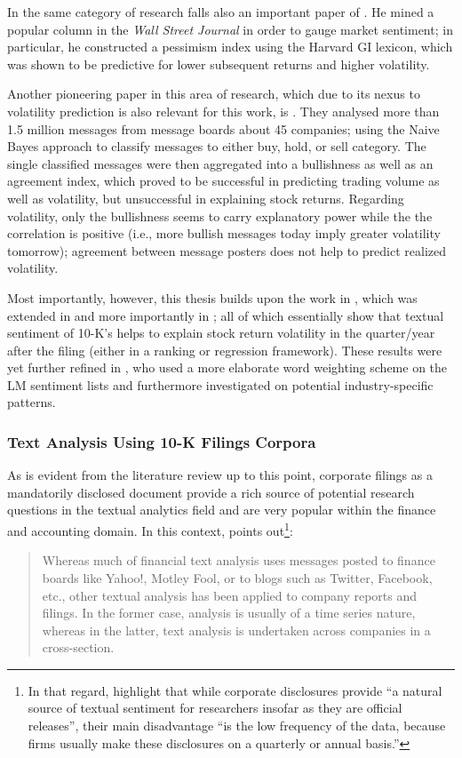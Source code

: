 In the same category of research falls also an important paper of \textcite{Tetlock2007}. He mined a popular column in the \textit{Wall Street Journal} in order to gauge market sentiment; in particular, he constructed a pessimism index using the Harvard GI lexicon, which was shown to be predictive for lower subsequent returns and higher volatility.

Another pioneering paper in this area of research, which due to its nexus to volatility prediction is also relevant for this work, is \textcite{AntweilerFrank2004}. They analysed more than 1.5 million messages from message boards about 45 companies; using the Naive Bayes approach to classify messages to either buy, hold, or sell category. The single classified messages were then aggregated into a bullishness as well as an agreement index, which proved to be successful in predicting trading volume as well as volatility, but unsuccessful in explaining stock returns. Regarding volatility, only the bullishness seems to carry explanatory power while the the correlation is positive (i.e., more bullish messages today imply greater volatility tomorrow); agreement between message posters does not help to predict realized volatility. 

Most importantly, however, this thesis builds upon the work in \textcite{Kogan2009_1}, which was extended in \textcite{TsaiWang2012, TsaiWang2013, TsaiWang2014, TsaiWangChien2016, WangTsaiLiuChang2013} and more importantly in \textcite{TsaiWang2016}; all of which essentially show that textual sentiment of 10-K's helps to explain stock return volatility in the quarter/year after the filing (either in a ranking or regression framework). These results were yet further refined in \textcite{Rekabsaz2017}, who used a more elaborate word weighting scheme on the LM sentiment lists and furthermore investigated on potential industry-specific patterns. 

\subsubsection{Text Analysis Using 10-K Filings Corpora}
\label{sssec: lit_rev_mining_10K}

As is evident from the literature review up to this point, corporate filings as a mandatorily disclosed document provide a rich source of potential research questions in the textual analytics field and are very popular within the finance and accounting domain. In this context, \textcite[223]{Das2014} points out\footnote{In that regard, \textcite[3]{KearneyLiu2014} highlight that while corporate disclosures provide \enquote{a natural source of textual sentiment for researchers insofar as they are official releases}, their main disadvantage \enquote{is the low frequency of the data, because firms usually make these disclosures on a quarterly or annual basis.}}: 
\blockquote{Whereas much of financial text analysis uses messages posted to finance boards like Yahoo!, Motley Fool, or to blogs such as Twitter, Facebook, etc., other textual analysis has been applied to company reports and filings. In the former case, analysis is usually of a time series nature, whereas in the latter, text analysis is undertaken across companies in a cross-section.}

